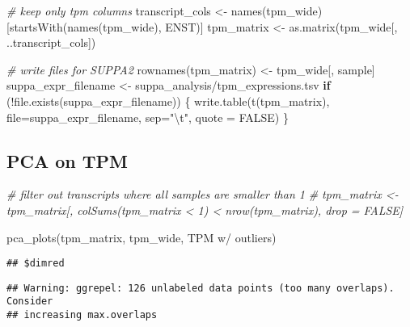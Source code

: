 \documentclass[
]{article}
\newenvironment{Shaded}{\begin{snugshade}}{\end{snugshade}}
\newcommand{\AttributeTok}[1]{\textcolor[rgb]{0.77,0.63,0.00}{#1}}
\newcommand{\CommentTok}[1]{\textcolor[rgb]{0.56,0.35,0.01}{\textit{#1}}}
\newcommand{\ConstantTok}[1]{\textcolor[rgb]{0.00,0.00,0.00}{#1}}
\newcommand{\ControlFlowTok}[1]{\textcolor[rgb]{0.13,0.29,0.53}{\textbf{#1}}}
\newcommand{\FunctionTok}[1]{\textcolor[rgb]{0.00,0.00,0.00}{#1}}
\newcommand{\NormalTok}[1]{#1}
\newcommand{\OtherTok}[1]{\textcolor[rgb]{0.56,0.35,0.01}{#1}}
\newcommand{\SpecialCharTok}[1]{\textcolor[rgb]{0.00,0.00,0.00}{#1}}
\newcommand{\StringTok}[1]{\textcolor[rgb]{0.31,0.60,0.02}{#1}}
\begin{document}
\begin{Shaded}
\begin{Highlighting}[]
\CommentTok{\# keep only tpm columns}
\NormalTok{transcript\_cols }\OtherTok{\textless{}{-}} \FunctionTok{names}\NormalTok{(tpm\_wide)[}\FunctionTok{startsWith}\NormalTok{(}\FunctionTok{names}\NormalTok{(tpm\_wide), }\StringTok{\textquotesingle{}ENST\textquotesingle{}}\NormalTok{)]}
\NormalTok{tpm\_matrix }\OtherTok{\textless{}{-}} \FunctionTok{as.matrix}\NormalTok{(tpm\_wide[, ..transcript\_cols])}

\CommentTok{\# write files for SUPPA2}
\FunctionTok{rownames}\NormalTok{(tpm\_matrix) }\OtherTok{\textless{}{-}}\NormalTok{ tpm\_wide[, sample]}
\NormalTok{suppa\_expr\_filename }\OtherTok{\textless{}{-}} \StringTok{\textquotesingle{}suppa\_analysis/tpm\_expressions.tsv\textquotesingle{}}
\ControlFlowTok{if}\NormalTok{ (}\SpecialCharTok{!}\FunctionTok{file.exists}\NormalTok{(suppa\_expr\_filename)) \{}
  \FunctionTok{write.table}\NormalTok{(}\FunctionTok{t}\NormalTok{(tpm\_matrix), }\AttributeTok{file=}\NormalTok{suppa\_expr\_filename, }\AttributeTok{sep=}\StringTok{"}\SpecialCharTok{\textbackslash{}t}\StringTok{"}\NormalTok{, }\AttributeTok{quote =} \ConstantTok{FALSE}\NormalTok{)}
\NormalTok{\}}
\end{Highlighting}
\end{Shaded}

\hypertarget{pca-on-tpm}{%
\subsection{PCA on TPM}\label{pca-on-tpm}}

\begin{Shaded}
\begin{Highlighting}[]
\CommentTok{\# filter out transcripts where all samples are smaller than 1}
\CommentTok{\# tpm\_matrix \textless{}{-} tpm\_matrix[, colSums(tpm\_matrix \textless{} 1) \textless{} nrow(tpm\_matrix), drop = FALSE]}

\FunctionTok{pca\_plots}\NormalTok{(tpm\_matrix, tpm\_wide, }\StringTok{\textquotesingle{}TPM w/ outliers\textquotesingle{}}\NormalTok{)}
\end{Highlighting}
\end{Shaded}

\begin{verbatim}
## $dimred
\end{verbatim}

\begin{verbatim}
## Warning: ggrepel: 126 unlabeled data points (too many overlaps). Consider
## increasing max.overlaps
\end{verbatim}
\end{document}
